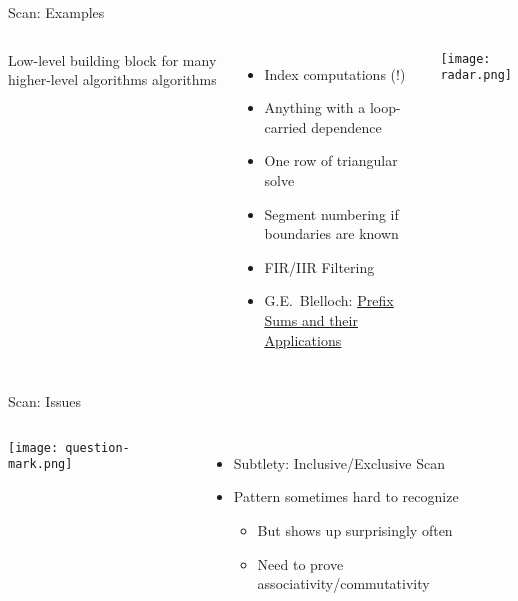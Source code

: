 \documentclass[english,compress]{beamer}
\def\weblink#1#2{\href{#1}{\color{blue}\underline{#2}}}
\begin{document}
\begin{frame}{Scan: Examples}
  \begin{columns}

      Low-level building block for many higher-level algorithms
      algorithms

      \begin{itemize}
        \item Index computations (!)
        \item Anything with a loop-carried dependence
        \item One row of triangular solve
        \item Segment numbering if boundaries are known
        \item FIR/IIR Filtering
        \item G.E.~Blelloch:
        \weblink{http://www.cs.cmu.edu/~guyb/papers/Ble93.pdf}{Prefix Sums and their Applications}
      \end{itemize}

      \texttt{[image: radar.png]}
  \end{columns}
\end{frame}
\begin{frame}{Scan: Issues}
  \begin{columns}
      \texttt{[image: question-mark.png]}
      \begin{itemize}
        \item Subtlety: Inclusive/Exclusive Scan
        \item Pattern sometimes hard to recognize
          \begin{itemize}
            \item But shows up surprisingly often
            \item Need to prove associativity/commutativity
          \end{itemize}
      \end{itemize}
  \end{columns}
\end{frame}
\end{document}
